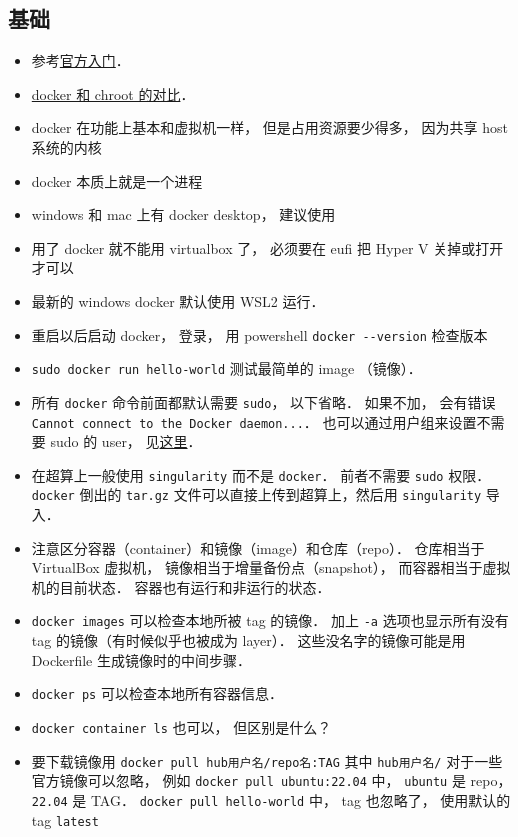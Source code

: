 \subsection{基础}
\begin{itemize}
\item 参考\href{https://docs.docker.com/get-started/}{官方入门}．
\item \href{https://devops.stackexchange.com/questions/2826/difference-between-chroot-and-docker}{docker 和 chroot 的对比}．
\item docker 在功能上基本和虚拟机一样， 但是占用资源要少得多， 因为共享 host 系统的内核
\item docker 本质上就是一个进程
\item windows 和 mac 上有 docker desktop， 建议使用
\item 用了 docker 就不能用 virtualbox 了， 必须要在 eufi 把 Hyper V 关掉或打开才可以
\item 最新的 windows docker 默认使用 WSL2 运行．
\item 重启以后启动 docker， 登录， 用 powershell \verb`docker --version` 检查版本
\item \verb`sudo docker run hello-world` 测试最简单的 image （镜像）．
\item 所有 \verb|docker| 命令前面都默认需要 \verb|sudo|， 以下省略． 如果不加， 会有错误 \verb|Cannot connect to the Docker daemon...|． 也可以通过用户组来设置不需要 sudo 的 user， 见\href{https://docs.docker.com/engine/install/linux-postinstall/}{这里}．
\item 在超算上一般使用 \verb|singularity| 而不是 \verb|docker|． 前者不需要 \verb|sudo| 权限． \verb|docker| 倒出的 \verb|tar.gz| 文件可以直接上传到超算上，然后用 \verb|singularity| 导入．
\item 注意区分容器（container）和镜像（image）和仓库（repo）． 仓库相当于 VirtualBox 虚拟机， 镜像相当于增量备份点（snapshot）， 而容器相当于虚拟机的目前状态． 容器也有运行和非运行的状态．
\item \verb`docker images` 可以检查本地所被 tag 的镜像． 加上 \verb|-a| 选项也显示所有没有 tag 的镜像（有时候似乎也被成为 layer）． 这些没名字的镜像可能是用 Dockerfile 生成镜像时的中间步骤．
\item \verb`docker ps` 可以检查本地所有容器信息．
\item \verb|docker container ls| 也可以， 但区别是什么？
\item 要下载镜像用 \verb`docker pull hub用户名/repo名:TAG` 其中 \verb|hub用户名/| 对于一些官方镜像可以忽略， 例如 \verb`docker pull ubuntu:22.04` 中， \verb|ubuntu| 是 repo， \verb|22.04| 是 TAG． \verb|docker pull hello-world| 中， tag 也忽略了， 使用默认的 tag \verb|latest|

\end{itemize}
